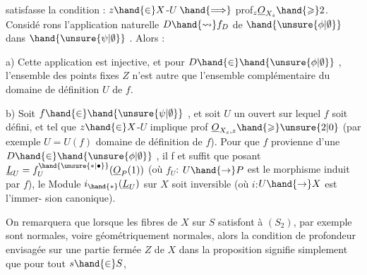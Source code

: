  satisfasse la condition : $z \hand{\in} X$-$U$ $\hand{\Longrightarrow}$ prof$_z \underline{O}_{X_s} \hand{\geqslant} 2$. Considé
rons l'application naturelle  $D \hand{\rightsquigarrow} f_D$  de $\hand{\unsure{\phi|\emptyset}}$  dans $\hand{\unsure{\psi|\emptyset}}$ .  Alors :

a)  Cette application est injective,  et  pour $D \hand{\in} \hand{\unsure{\phi|\emptyset}}$ , l'ensemble des
points fixes $Z$  n'est autre que l'ensemble  complémentaire du domaine de
définition  $U$ de $f$.

b)   Soit
$f \hand{\in} \hand{\unsure{\psi|\emptyset}}$ , et soit $U$ un ouvert sur lequel $f$ soit défini, et tel que $z \hand{\in} X$-$U$
implique prof $\underline{O}_{X_s,z} \hand{\geqslant} \unsure{2|0}$  (par exemple $U = U(f)$ domaine de
définition de $f$). Pour que $f$ provienne d'une $D \hand{\in} \hand{\unsure{\phi|\emptyset}}$ , il f et suffit  que\hand{\unsure{$\surd$}}
posant $\underline{L}_U = f_U^{\hand{\unsure{*|\bullet}}}(\underline{O}_P(1))$  (où  $f_U$: $U \hand{\to} P$  est le morphisme induit par $f$),
 le Module  $i_{\hand{*}}(\underline{L}_U)$  sur $X$ soit inversible (où $i$:$U \hand{\to} X$ est l'immer-%
sion canonique).

On remarquera que lorsque  les fibres de $X$ sur $S$ satisfont à $(S_2)$,
par exemple sont normales, voire géométriquement  normales, alors la
condition de profondeur  envisagée sur  une partie fermée $Z$ de $X$ dans 
la proposition  signifie simplement que pour tout $s \hand{\in} S$,


